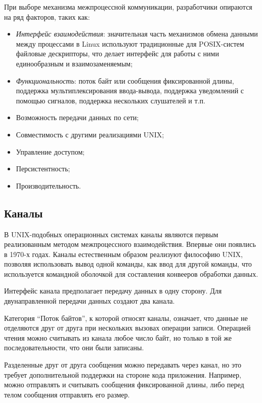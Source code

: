 \documentclass[14pt, russian]{scrartcl}
\begin{document}
При выборе механизма межпроцессной коммуникации, разработчики опираются на ряд
факторов, таких как:

\begin{itemize}
  \item \emph{Интерфейс взаимодействия}: значительная часть механизмов обмена
        данными между процессами в Linux используют традиционные для
        POSIX-систем файловые дескрипторы, что делает интерфейс для работы с
        ними единообразным и взаимозаменяемым;
  \item \emph{Функциональность}: поток байт или сообщения фиксированной длины,
        поддержка мультиплексирования ввода-вывода, поддержка уведомлений с
        помощью сигналов, поддержка нескольких слушателей и т.п.
  \item Возможность передачи данных по сети;
  \item Совместимость с другими реализациями UNIX;
  \item Управление доступом;
  \item Персистентность;
  \item Производительность.

\end{itemize}

\subsection{Каналы}

В UNIX-подобных операционных системах каналы являются первым реализованным
методом межпроцессного взаимодействия. Впервые они появлись в 1970-х
годах.\cite{kerrisk2010linux} Каналы естественным образом реализуют философию
UNIX, позволяя использовать вывод одной команды, как ввод для другой команды,
что используется командной оболочкой для составления конвееров обработки данных.

Интерфейс канала предполагает передачу данных в одну сторону. Для
двунаправленной передачи данных создают два канала.

Категория ``Поток байтов'', к которой относят каналы, означает, что данные не
отделяются друг от друга при нескольких вызовах операции записи. Операцией
чтения можно считывать из канала любое число байт, но только в той же
последовательности, что они были записаны.

Разделенные друг от друга сообщения можно передавать через канал, но это требует
дополнительной поддержки на стороне кода приложения. Например, можно отправлять
и считывать сообщения фиксированной длины, либо перед телом сообщения отправлять
его размер.
\end{document}
